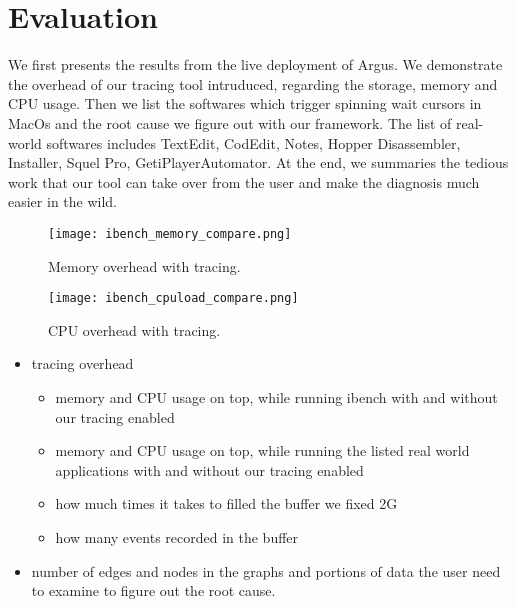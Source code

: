 \section{Evaluation}
We first presents the results from the live deployment of Argus.
We demonstrate the overhead of our tracing tool intruduced, regarding the storage, memory and CPU usage.
Then we list the softwares which trigger spinning wait cursors in MacOs and the root cause we figure out with our framework.
The list of real-world softwares includes TextEdit, CodEdit, Notes, Hopper Disassembler, Installer, Squel Pro, GetiPlayerAutomator.
At the end, we summaries the tedious work that our tool can take over from the user and make the diagnosis much easier in the wild.

\begin{figure}[tb]
    \centering
    \texttt{[image: ibench\_memory\_compare.png]}
    \caption{Memory overhead with tracing.}
    \label{fig:ibench_memory_overhead}
\end{figure}

\begin{figure}[tb]
    \centering
    \texttt{[image: ibench\_cpuload\_compare.png]}
    \caption{CPU overhead with tracing.}
    \label{fig:ibench_cpu_overhead}
\end{figure}

\begin{itemize}
\item tracing overhead
	\begin{itemize}
	\item memory and CPU usage on top, while running ibench with and without our tracing enabled
	\item memory and CPU usage on top, while running the listed real world applications with and without our tracing enabled
	\item how much times it takes to filled the buffer we fixed 2G
	\item how many events recorded in the buffer
	\end{itemize}
\item number of edges and nodes in the graphs and portions of data the user need to examine to figure out the root cause.
\end{itemize}
